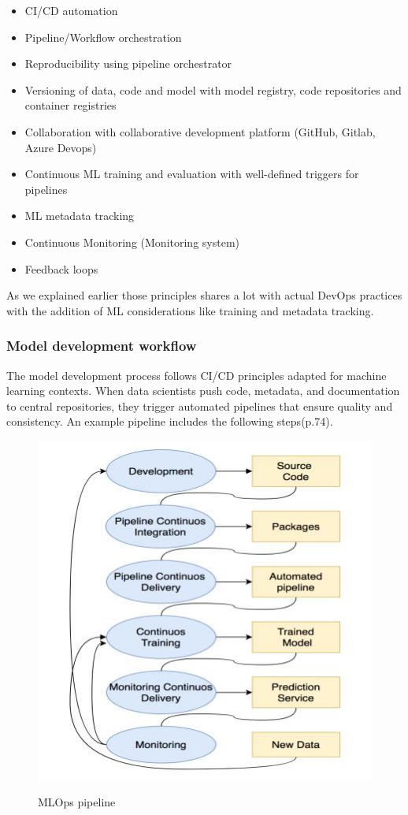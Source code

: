 \begin{itemize}
    \item CI/CD automation
    \item Pipeline/Workflow orchestration
    \item Reproducibility using pipeline orchestrator
    \item Versioning of data, code and model with model registry, code repositories and container registries
    \item Collaboration with collaborative development platform (GitHub, Gitlab, Azure Devops)
    \item Continuous ML training and evaluation with well-defined triggers for pipelines
    \item ML metadata tracking
    \item Continuous Monitoring (Monitoring system)
    \item Feedback loops
\end{itemize}

As we explained earlier those principles shares a lot with actual DevOps practices with the addition of ML considerations
like training and metadata tracking.

\subsubsection{Model development workflow}
The model development process follows CI/CD principles adapted for machine learning contexts.
When data scientists push code, metadata, and documentation to central repositories,
they trigger automated pipelines that ensure quality and consistency\cite{10855428}.
An example pipeline includes the following steps\cite{treveil2020introducing}(p.74).

\begin{figure}[!htbp]
    \caption{MLOps pipeline\cite{inproceedings}}
    \centering
    \includegraphics[scale=0.5]{images/mlops-pipeline}
    \label{fig:mlops-pipeline}
\end{figure}

